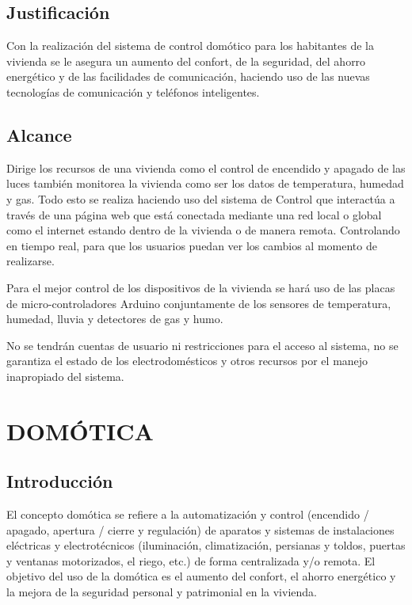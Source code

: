 \documentclass[11pt,letterpaper]{report}
\begin{document}
	\section{Justificación}
	Con la realización del sistema de control domótico para los habitantes de la vivienda se le asegura un aumento del confort, de la seguridad, del ahorro energético y de las facilidades de comunicación, haciendo uso de las nuevas tecnologías de comunicación y teléfonos inteligentes.
	\section{Alcance}
	Dirige los recursos de una vivienda  como el control de encendido y apagado de las luces también monitorea la vivienda como ser los datos de  temperatura, humedad y gas. Todo esto se realiza  haciendo uso del sistema de Control que interactúa  a través de una página web que está conectada mediante una red local o global como el internet estando dentro de la vivienda o de manera remota. Controlando en tiempo real, para que los  usuarios  puedan ver los cambios al momento de realizarse.
	
Para el mejor control de los dispositivos de la vivienda se hará uso de las placas de micro-controladores Arduino conjuntamente de los sensores de temperatura, humedad, lluvia y detectores de gas y humo.

No se tendrán cuentas de usuario ni restricciones para el acceso al sistema, no se   garantiza el estado de los electrodomésticos y otros recursos por el manejo inapropiado del sistema.



\chapter{DOMÓTICA}	
	\section{Introducción}
	El concepto domótica se refiere a la automatización y control (encendido / apagado, apertura / cierre y regulación) de aparatos y sistemas de instalaciones eléctricas y electrotécnicos (iluminación, climatización, persianas y toldos, puertas y ventanas motorizados, el riego, etc.) de forma centralizada y/o remota. El objetivo del uso de la domótica es el aumento del confort, el ahorro energético y la mejora de la seguridad personal y patrimonial en la vivienda. \citep{morales2011} 
	
\end{document}
